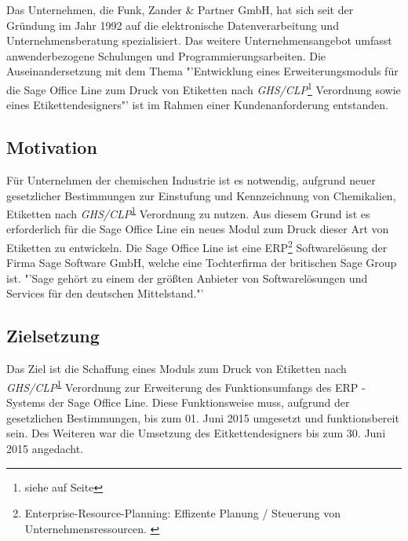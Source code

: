 Das Unternehmen, die Funk, Zander \& Partner GmbH, hat sich seit der Gründung im 
Jahr 1992 auf die elektronische Datenverarbeitung und Unternehmensberatung spezialisiert.
Das weitere Unternehmensangebot umfasst anwenderbezogene Schulungen und Programmierungsarbeiten.
Die Auseinandersetzung mit dem Thema "'Entwicklung  eines  Erweiterungsmoduls  für 
die  Sage Office Line zum Druck von Etiketten nach \emph{GHS/CLP}\footnote{\label{foot:ghs}
siehe  auf Seite \pageref{sec:Grundlagen}} Verordnung 
sowie eines Etikettendesigners"' ist im Rahmen einer Kundenanforderung entstanden.

\subsection{Motivation}
\label{subsec:Motivation}

Für Unternehmen der chemischen Industrie ist es notwendig, aufgrund neuer
gesetzlicher Bestimmungen zur Einstufung und Kennzeichnung von Chemikalien,
Etiketten nach \emph{GHS/CLP}\textsuperscript{\ref{foot:ghs}} Verordnung zu nutzen.
Aus diesem Grund ist es erforderlich für die Sage Office Line ein neues Modul zum Druck 
dieser Art von Etiketten zu entwickeln. Die Sage Office Line ist eine 
ERP\footnote{\label{foot:erp}
Enterprise-Resource-Planning: Effizente Planung / Steuerung von Unternehmensressourcen. 
\cite{ERP}} Softwarelösung der Firma Sage Software GmbH, welche eine 
Tochterfirma der britischen Sage Group ist. "'Sage gehört zu einem der größten 
Anbieter von Softwarelösungen und Services für den deutschen Mittelstand."' \cite{sage} 


\subsection{Zielsetzung}
\label{subsec:Zielsetzung}

Das Ziel ist die Schaffung eines Moduls zum Druck von Etiketten nach 
\emph{GHS/CLP}\textsuperscript{\ref{foot:ghs}} Verordnung zur Erweiterung des Funktionsumfangs 
des ERP - Systems der Sage Office Line. Diese Funktionsweise muss, aufgrund der gesetzlichen
Bestimmungen, bis zum 01. Juni 2015 umgesetzt und funktionsbereit sein\cite{ifag}. 
Des Weiteren war die Umsetzung des Eitkettendesigners bis zum 30. Juni 2015 angedacht.  